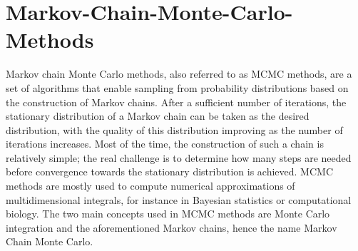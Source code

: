 \clearpage
\section{Markov-Chain-Monte-Carlo-Methods}
Markov chain Monte Carlo methods, also referred to as MCMC methods, are a set of algorithms that enable sampling from probability distributions based on the construction of Markov chains. After a sufficient number of iterations, the stationary distribution of a Markov chain can be taken as the desired distribution, with the quality of this distribution improving as the number of iterations increases. Most of the time, the construction of such a chain is relatively simple; the real challenge is to determine how many steps are needed before convergence towards the stationary distribution is achieved. MCMC methods are mostly used to compute numerical approximations of multidimensional integrals, for instance in Bayesian statistics or computational biology. The two main concepts used in MCMC methods are Monte Carlo integration and the aforementioned Markov chains, hence the name Markov Chain Monte Carlo.
